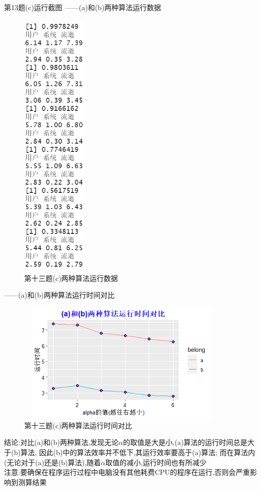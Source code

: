 \documentclass{book}
\begin{document}
第13题(c)运行截图
------(a)和(b)两种算法运行数据
\begin{figure}[H]
  \centering
  \includegraphics*[height = 13.14cm, width = 3.14cm]{gramFile/第十三题(c)两种算法运行数据.PNG}
  \caption{第十三题(c)两种算法运行数据}
\end{figure}
------(a)和(b)两种算法运行时间对比
\begin{figure}[H]
  \centering
  \includegraphics*[height = 5.8cm, width = 10.2cm]{gramFile/第十三题(c)两种算法运行时间对比折线图.PNG}
  \caption{第十三题(c)两种算法运行时间对比}
\end{figure}
\noindent
结论:对比(a)和(b)两种算法,发现无论$\alpha$的取值是大是小,(a)算法的运行时间总是大于(b)算法,
因此(b)中的算法效率并不低下,其运行效率要高于(a)算法;
而在算法内(无论对于(a)还是(b)算法),随着$\alpha$取值的减小,运行时间也有所减少 \\
注意:要确保在程序运行过程中电脑没有其他耗费CPU的程序在运行,否则会严重影响到测算结果
\end{document}
